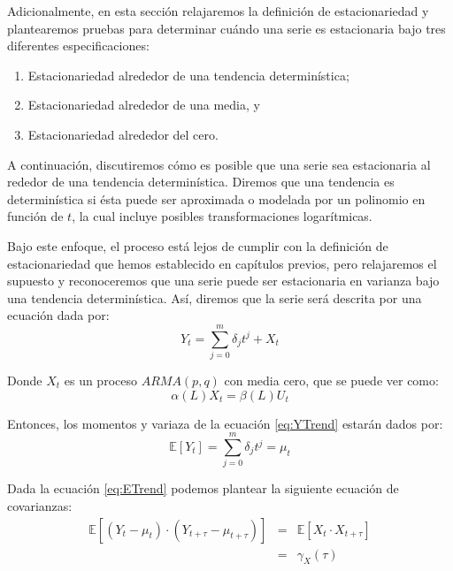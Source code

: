 \documentclass[
]{book}
\begin{document}
Adicionalmente, en esta sección relajaremos la definición de estacionariedad y plantearemos pruebas para determinar cuándo una serie es estacionaria bajo tres diferentes especificaciones:

\begin{enumerate}
\def\labelenumi{\arabic{enumi}.}
\item
  Estacionariedad alrededor de una tendencia determinística;
\item
  Estacionariedad alrededor de una media, y
\item
  Estacionariedad alrededor del cero.
\end{enumerate}

A continuación, discutiremos cómo es posible que una serie sea estacionaria al rededor de una tendencia determinística. Diremos que una tendencia es determinística si ésta puede ser aproximada o modelada por un polinomio en función de \(t\), la cual incluye posibles transformaciones logarítmicas.

Bajo este enfoque, el proceso está lejos de cumplir con la definición de estacionariedad que hemos establecido en capítulos previos, pero relajaremos el supuesto y reconoceremos que una serie puede ser estacionaria en varianza bajo una tendencia determinística. Así, diremos que la serie será descrita por una ecuación dada por:
\begin{equation}
    Y_t = \sum^m_{j = 0} \delta_j t^j + X_t
    \label{eq:YTrend}
\end{equation}

Donde \(X_t\) es un proceso \(ARMA(p, q)\) con media cero, que se puede ver como:
\begin{equation}
    \alpha(L) X_t = \beta(L) U_t
\end{equation}

Entonces, los momentos y variaza de la ecuación \eqref{eq:YTrend} estarán dados por:
\begin{equation}
    \mathbb{E}[Y_t] = \sum^m_{j = 0} \delta_j t^j = \mu_t
    \label{eq:ETrend}
\end{equation}

Dada la ecuación \eqref{eq:ETrend} podemos plantear la siguiente ecuación de covarianzas:
\begin{eqnarray}
    \mathbb{E}[(Y_t - \mu_t) \cdot (Y_{t+\tau} - \mu_{t+\tau})] & = & \mathbb{E}[X_t \cdot X_{t+\tau}] \nonumber \\
    & = & \gamma_X(\tau)
    \label{eq:CovTrend}
\end{eqnarray}
\end{document}
